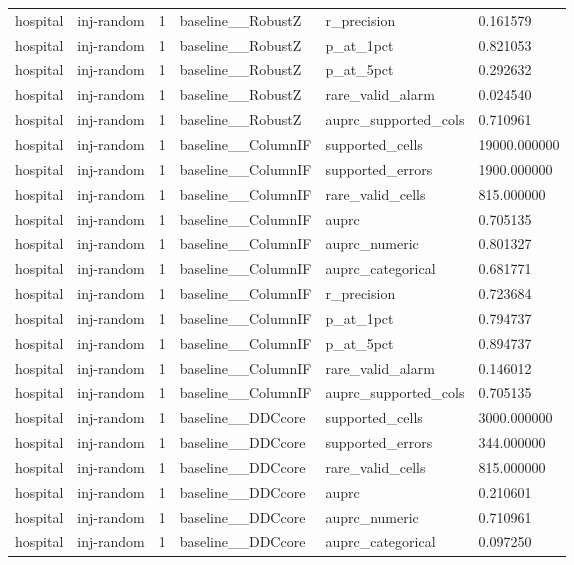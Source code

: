 \begin{tabular}{llllll}
hospital & inj-random & 1 & baseline\_\_RobustZ & r\_precision & 0.161579 \\
hospital & inj-random & 1 & baseline\_\_RobustZ & p\_at\_1pct & 0.821053 \\
hospital & inj-random & 1 & baseline\_\_RobustZ & p\_at\_5pct & 0.292632 \\
hospital & inj-random & 1 & baseline\_\_RobustZ & rare\_valid\_alarm & 0.024540 \\
hospital & inj-random & 1 & baseline\_\_RobustZ & auprc\_supported\_cols & 0.710961 \\
hospital & inj-random & 1 & baseline\_\_ColumnIF & supported\_cells & 19000.000000 \\
hospital & inj-random & 1 & baseline\_\_ColumnIF & supported\_errors & 1900.000000 \\
hospital & inj-random & 1 & baseline\_\_ColumnIF & rare\_valid\_cells & 815.000000 \\
hospital & inj-random & 1 & baseline\_\_ColumnIF & auprc & 0.705135 \\
hospital & inj-random & 1 & baseline\_\_ColumnIF & auprc\_numeric & 0.801327 \\
hospital & inj-random & 1 & baseline\_\_ColumnIF & auprc\_categorical & 0.681771 \\
hospital & inj-random & 1 & baseline\_\_ColumnIF & r\_precision & 0.723684 \\
hospital & inj-random & 1 & baseline\_\_ColumnIF & p\_at\_1pct & 0.794737 \\
hospital & inj-random & 1 & baseline\_\_ColumnIF & p\_at\_5pct & 0.894737 \\
hospital & inj-random & 1 & baseline\_\_ColumnIF & rare\_valid\_alarm & 0.146012 \\
hospital & inj-random & 1 & baseline\_\_ColumnIF & auprc\_supported\_cols & 0.705135 \\
hospital & inj-random & 1 & baseline\_\_DDCcore & supported\_cells & 3000.000000 \\
hospital & inj-random & 1 & baseline\_\_DDCcore & supported\_errors & 344.000000 \\
hospital & inj-random & 1 & baseline\_\_DDCcore & rare\_valid\_cells & 815.000000 \\
hospital & inj-random & 1 & baseline\_\_DDCcore & auprc & 0.210601 \\
hospital & inj-random & 1 & baseline\_\_DDCcore & auprc\_numeric & 0.710961 \\
hospital & inj-random & 1 & baseline\_\_DDCcore & auprc\_categorical & 0.097250 \\

\end{tabular}
